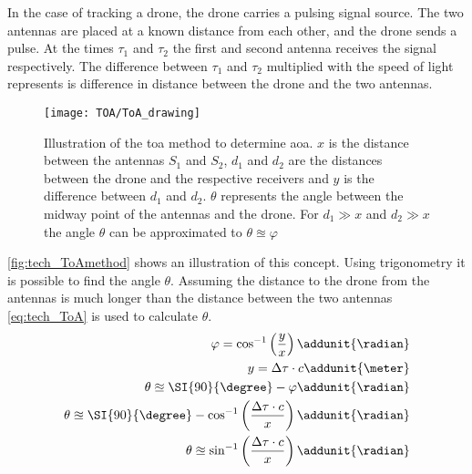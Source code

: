 In the case of tracking a drone, the drone carries a pulsing signal source. The two antennas are placed at a known distance from each other, and the drone sends a pulse.
At the times $\tau_1$ and $\tau_2$ the first and second antenna receives the signal respectively. The difference between $\tau_1$ and $\tau_2$ multiplied with the speed of light represents is difference in distance between the drone and the two antennas.

\begin{figure} [h]
	\centering
	\texttt{[image: TOA/ToA\_drawing]}
	\caption{Illustration of the \gls{toa} method to determine \gls{aoa}. $x$ is the distance between the antennas $S_1$ and $S_2$, $d_1$ and $d_2$ are the distances between the drone and the respective receivers and $y$ is the difference between $d_1$  and $d_2$. $\theta$ represents the angle between the midway point of the antennas and the drone. For $d_1 \gg x$ and $d_2 \gg x$ the angle $\theta$ can be approximated to $\theta \approxeq \varphi$}\label{fig:tech_ToAmethod}
\end{figure}

\autoref{fig:tech_ToAmethod} shows an illustration of this concept. Using trigonometry it is possible to find the angle $\theta$. Assuming the distance to the drone from the antennas is much longer than the distance between the two antennas \autoref{eq:tech_ToA} is used to calculate $\theta$.
\begin{subequations} \label{eq:tech_ToA}
	\begin{align}
		\varphi = \cos^{-1} \left( \frac{y}{x} \right) \addunit{\radian} \\
		y = \Delta \tau \cdot c \addunit{\meter} \\
		\theta \approxeq \SI{90}{\degree} - \varphi \addunit{\radian} \\
		\theta \approxeq \SI{90}{\degree} - \cos^{-1} \left( \frac{ \Delta\tau \cdot c}{x} \right) \addunit{\radian} \\
  		\theta \approxeq \sin^{-1} \left( \frac{ \Delta\tau \cdot c}{x} \right) \addunit{\radian}
	\end{align}
\end{subequations}
\startexplain
{}
\stopexplain


